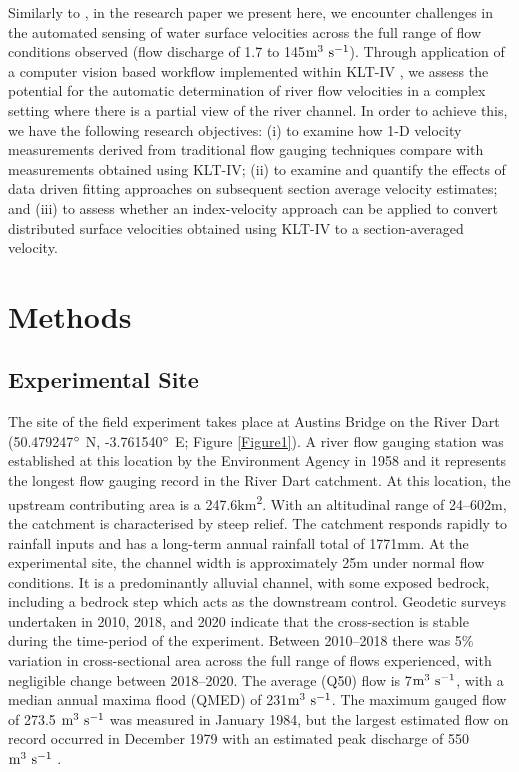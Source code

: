 \documentclass[hess, manuscript]{copernicus} %
\begin{document}
Similarly to \citet{Hutley2023}, in the research paper we present here, we encounter challenges in the automated sensing of water surface velocities across the full range of flow conditions observed (flow discharge of 1.7 to 145$\textnormal{m\textsuperscript{3} s\textsuperscript{-1}}$). Through application of a computer vision based workflow implemented within KLT-IV \citep{Perks2020a}, we assess the potential for the automatic determination of river flow velocities in a complex setting where there is a partial view of the river channel. In order to achieve this, we have the following research objectives: (i) to examine how 1-D velocity measurements derived from traditional flow gauging techniques compare with measurements obtained using KLT-IV; (ii) to examine and quantify the effects of data driven fitting approaches on subsequent section average velocity estimates; and (iii) to assess whether an index-velocity approach can be applied to convert distributed surface velocities obtained using KLT-IV to a section-averaged velocity.

\section{Methods}
\subsection{Experimental Site}
The site of the field experiment takes place at Austins Bridge on the River Dart (50.479247$\degree$ N, -3.761540$\degree$ E; Figure \ref{Figure1}). A river flow gauging station was established at this location by the Environment Agency in 1958 and it represents the longest flow gauging record in the River Dart catchment. At this location, the upstream contributing area is a 247.6km\textsuperscript{2}. With an altitudinal range of 24--602m, the catchment is characterised by steep relief. The catchment responds rapidly to rainfall inputs and has a long-term annual rainfall total of 1771mm. At the experimental site, the channel width is approximately 25m under normal flow conditions. It is a predominantly alluvial channel, with some exposed bedrock, including a bedrock step which acts as the downstream control. Geodetic surveys undertaken in 2010, 2018, and 2020 indicate that the cross-section is stable during the time-period of the experiment. Between 2010--2018 there was 5\% variation in cross-sectional area across the full range of flows experienced, with negligible change between 2018--2020. The average (Q50) flow is 7$\textnormal{m\textsuperscript{3} s\textsuperscript{-1}}$, with a median annual maxima flood (QMED) of 231$\textnormal{m\textsuperscript{3} s\textsuperscript{-1}}$. The maximum gauged flow of 273.5 $\textnormal{m\textsuperscript{3} s\textsuperscript{-1}}$ was measured in January 1984, but the largest estimated flow on record occurred in December 1979 with an estimated peak discharge of 550$\textnormal{m\textsuperscript{3} s\textsuperscript{-1}}$ \citep{ceh2024}.
\end{document}
